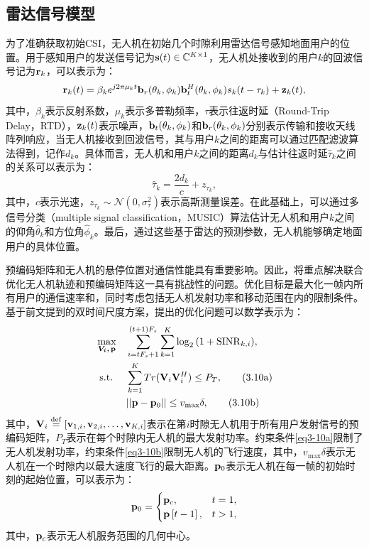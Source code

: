 \documentclass{article}
\newcommand{\triangleq}{\stackrel{\mathrm{def}}{=}}
\begin{document}
    \subsection{雷达信号模型}\label{section3-1-4}
    为了准确获取初始CSI，无人机在初始几个时隙利用雷达信号感知地面用户的位置。用于感知用户的发送信号记为$\bold s(t)\in \mathbb{C}^{K\times 1}$，无人机处接收到的用户$k$的回波信号记为$\bold r_k$，可以表示为：
    \begin{equation}\label{eq3-8}
      \bold r_k(t)=\beta_k e^{j2\pi\mu_kt}\bold b_r(\theta_k,\phi_k)\bold b_t^{H}(\theta_k,\phi_k)s_k(t-\tau_k)+\bold z_k(t),
    \end{equation}
    其中，$\beta_k$表示反射系数，$\mu_k$表示多普勒频率，$\tau$表示往返时延（Round-Trip Delay，RTD），$\bold z_k(t)$表示噪声，$\bold b_t(\theta_k,\phi_k)$和$\bold b_r(\theta_k,\phi_k)$分别表示传输和接收天线阵列响应，当无人机接收到回波信号，其与用户$k$之间的距离可以通过匹配滤波算法得到，记作$d_k$。具体而言，无人机和用户$k$之间的距离$d_k$与估计往返时延$\hat{\tau}_k$之间的关系可以表示为：
    \begin{equation}
      \hat{\tau}_k = \frac{2d_k}{c}+z_{\tau_k},
    \end{equation}
    其中，$c$表示光速，$z_{\tau_k}\sim\mathcal{N}(0,\sigma_{\tau}^2)$表示高斯测量误差。在此基础上，可以通过多信号分类（multiple signal classification，MUSIC）算法估计无人机和用户$k$之间的仰角$\hat{\theta}_k$和方位角$\hat{\phi}_k$。最后，通过这些基于雷达的预测参数，无人机能够确定地面用户的具体位置。


    预编码矩阵和无人机的悬停位置对通信性能具有重要影响。因此，将重点解决联合优化无人机轨迹和预编码矩阵这一具有挑战性的问题。优化目标是最大化一帧内所有用户的通信速率和，同时考虑包括无人机发射功率和移动范围在内的限制条件。基于前文提到的双时间尺度方案，提出的优化问题可以数学表示为：
\begin{align}\label{eq3-10}
  \underset{\boldsymbol{V_i,} \, \bold p}{\max} \quad
  & \sum_{i=tF_s+1}^{\left(t+1\right)F_s}\sum_{k=1}^K \log_{2}{\left(1+{\rm SINR}_{k,i}\right)},\\
  \text{ s.t.} \quad \
  &\sum_{k=1}^K Tr(\bold V_{i}\bold V_{i}^H) \le P_T, \tag{3.10a}\label{eq3-10a}\\
  &||\bold p-\bold p_0|| \le v_\text{max}\delta,\tag{3.10b}\label{eq3-10b}
\end{align}
其中，$\bold V_i \triangleq \left[\bold v_{1,i},\bold v_{2,i},\dots,\bold v_{K,i}\right]$表示在第$i$时隙无人机用于所有用户发射信号的预编码矩阵，$P_T$表示在每个时隙内无人机的最大发射功率。约束条件\eqref{eq3-10a}限制了无人机发射功率，约束条件\eqref{eq3-10b}限制无人机的飞行速度，其中，$v_\text{max}\delta$表示无人机在一个时隙内以最大速度飞行的最大距离。$\bold p_0$表示无人机在每一帧的初始时刻的起始位置，可以表示为：
\begin{equation}\label{eq10}
  \bold p_0=\begin{cases}\bold p_c,& t=1,\\
    \bold p\left[t-1\right],& t>1,
  \end{cases}
\end{equation}
其中，$\bold p_c$表示无人机服务范围的几何中心。
    
\end{document}
